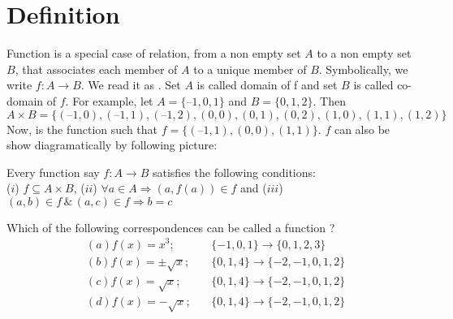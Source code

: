\documentclass[a4paper,10.5pt,fleqn]{article}
\begin{document}
\section{Definition}
Function is a special case of relation, from a non empty set $A$ to a non empty set $B$, that associates each member of $A$ to a unique member of $B$. Symbolically, we write $f: A \rightarrow B$. We read it as .
Set $A$ is called domain of f and set $B$ is called co-domain of $f$.
For example, let $A = \{–1, 0, 1\}$ and $B=\{0, 1, 2\}$. Then $A\times B = \{(–1, 0), (–1, 1), (–1, 2), (0, 0), (0, 1), (0, 2), (1, 0),(1, 1), (1, 2)\}$ Now,  is the function such that $f = \{(–1, 1), (0, 0), (1, 1)\}$. $f$ can also be show diagramatically by following picture:

\begin{figure}[h]
 \centering
\end{figure}

Every function say $f : A \rightarrow B$ satisfies the following conditions:\\
($i$) $f \subseteq A\times B$,   ($ii$) $\forall a\in A \Rightarrow (a, f(a)) \in f$ and ($iii$) $(a, b)\in f\, \&\, (a, c) \in f \Rightarrow b = c$
\begin{example}
Which of the following correspondences can be called a function ?
\begin{align*}
&(a) f(x) = x^3 ;&\, &\{-1, 0, 1\} \rightarrow \{0, 1, 2, 3\}\\
&(b) f(x) = \pm \sqrt{x} ;&\, &\{0, 1, 4\} \rightarrow \{-2, -1, 0, 1, 2\}\\
&(c) f(x) = \sqrt{x} ;&\, &\{0, 1, 4\} \rightarrow \{-2, -1, 0, 1, 2\}\\
&(d) f(x) = -\sqrt{x} ;&\, &\{0, 1, 4\} \rightarrow \{-2, -1, 0, 1, 2\}
\end{align*}
\end{example}
\end{document}
